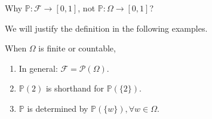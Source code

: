 \begin{problem}
    Why \(\mathbb{P} : \mathcal{F} \to [0,1]\), not \(\mathbb{P}: \Omega \to [0,1]\)?
\end{problem}
We will justify the definition in the following examples.
\begin{example}
When \(\Omega\) is finite or countable,
\begin{enumerate}
    \item In general: \(\mathcal{F} = \mathcal{P} (\Omega)\).
    \item \(\mathbb{P}(2)\) is shorthand for \(\mathbb{P}(\{2\})\).
    \item \(\mathbb{P}\) is determined by  \(\mathbb{P}(\{w\}), \forall w \in \Omega\).
\end{enumerate}
\end{example}

